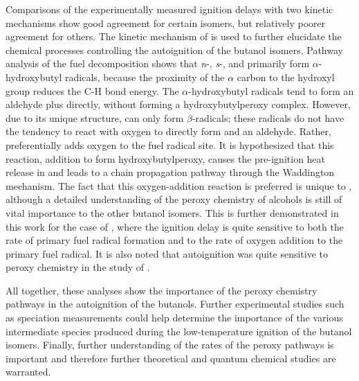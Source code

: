 \documentclass[../main.tex]{subfiles}
\begin{document}
Comparisons of the experimentally measured ignition delays with two kinetic
mechanisms show good agreement for certain isomers, but relatively poorer
agreement for others. The kinetic mechanism of \textcite{Sarathy2012} is used
to further elucidate the chemical processes controlling the autoignition of
the butanol isomers. Pathway analysis of the fuel decomposition shows that
\textit{n}-, \textit{s}-, and \iBuOH{} primarily form
$\alpha$-hydroxybutyl radicals, because the proximity of the $\alpha$ carbon to
the hydroxyl group reduces the C-H bond energy. The $\alpha$-hydroxybutyl radicals
tend to form an aldehyde plus  directly, without forming a
hydroxybutylperoxy complex. However, due to its unique structure,
\tBuOH{} can only form $\beta$-radicals; these radicals do not have
the tendency to react with oxygen to directly form  and an aldehyde.
Rather, \tBuOH{} preferentially adds oxygen to the fuel radical site.
It is hypothesized that this reaction,  addition to form
hydroxybutylperoxy, causes the pre-ignition heat release in \tBuOH{}
and leads to a chain propagation pathway through the Waddington mechanism. The
fact that this oxygen-addition reaction is preferred is unique to
\tBuOH{}, although a detailed understanding of the peroxy chemistry
of alcohols is still of vital importance to the other butanol isomers. This is
further demonstrated in this work for the case of \iBuOH{}, where the
ignition delay is quite sensitive to both the rate of primary fuel
radical formation and to the rate of oxygen addition to the primary fuel
radical. It is also noted that \nBuOH{} autoignition was
quite sensitive to peroxy chemistry in the study of \textcite{Vranckx2011}.

All together, these analyses show the importance of the peroxy chemistry
pathways in the autoignition of the butanols. Further experimental studies
such as speciation measurements could help determine the importance of
the various intermediate species produced during the low-temperature ignition
of the butanol isomers.
Finally, further understanding of the rates of the peroxy pathways is
important and therefore further theoretical and quantum chemical studies are
warranted.
\end{document}
